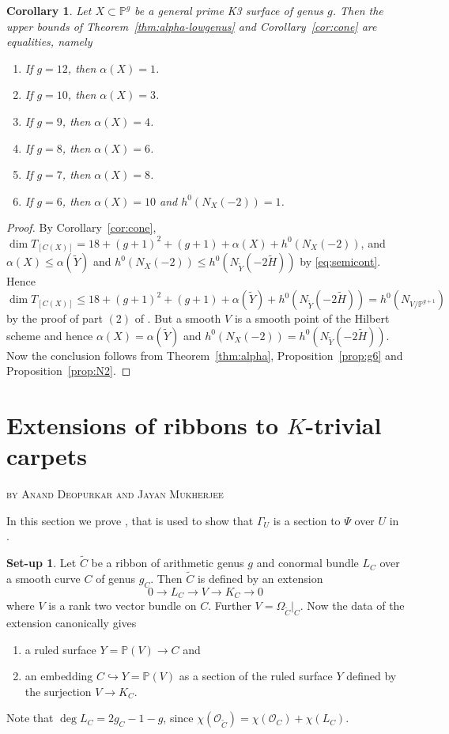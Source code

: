 \documentclass[11pt,twoside]{amsart}
\theoremstyle{plain}
\newtheorem{corollary}[theorem]{Corollary}
\theoremstyle{definition}
\newtheorem{setup}[theorem]{Set-up}
\newcommand{\PP}{\mathbb{P}}
\newcommand{\OO}{\mathcal{O}}
\newcommand{\Yt}{\widetilde{Y}}
\newcommand{\Ht}{\widetilde{H}}
\newcommand{\Ct}{\widetilde{C}}
\newcommand{\NYt}{N_{\Yt}}
\begin{document}
\begin{corollary}\label{cor:equality}
Let $X\subset\PP^g$ be a general prime K3 surface of genus $g$. Then the upper bounds of Theorem~\ref{thm:alpha-lowgenus} and Corollary~\ref{cor:cone} are equalities, namely
\begin{enumerate}
    \item If $g=12$, then $\alpha(X)=1$.
    \item If $g=10$, then $\alpha(X)=3$.
    \item If $g=9$, then $\alpha(X)=4$.
    \item If $g=8$, then $\alpha(X)=6$.
    \item If $g=7$, then $\alpha(X)=8$.
    \item If $g=6$, then $\alpha(X)=10$ and $h^0(N_X(-2))=1$.
\end{enumerate}
\end{corollary}

\begin{proof}
By Corollary~\ref{cor:cone}, $\dim T_{[C(X)]}=18+(g+1)^2+(g+1)+\alpha(X)+h^0(N_X(-2))$, and  $\alpha(X)\le\alpha(\Yt)$ and $h^0(N_X(-2))\le h^0(\NYt(-2\Ht))$ by \eqref{eq:semicont}. Hence $\dim T_{[C(X)]} \leq 18+(g+1)^2+(g+1)+\alpha(\widetilde Y)+h^0(N_{\widetilde Y}(-2\widetilde H)) = h^0(N_{V/\PP^{g+1}})$ by the proof of part $(2)$ of . But a smooth $V$ is a smooth point of the Hilbert scheme and hence $\alpha(X) = \alpha(\Yt)$ and $h^0(N_{X}(-2)) = h^0(N_{\widetilde Y}(-2\widetilde H))$. Now the conclusion follows from Theorem~\ref{thm:alpha}, Proposition~\ref{prop:g6} and Proposition~\ref{prop:N2}.
\end{proof}

\appendix
\section{Extensions of ribbons to \texorpdfstring{$K$}{K}-trivial carpets}\label{sec:extensions}
\begin{center}\textsc{by Anand Deopurkar and Jayan Mukherjee}\end{center}

In this section we prove , that is used to show that $\Gamma_U$ is a section to $\Psi$ over $U$ in . 


\begin{setup}\label{setup:ribbon}
Let $\Ct$ be a ribbon of arithmetic genus $g$ and conormal bundle $L_C$ over a smooth curve $C$ of genus $g_C$. Then $\Ct$ is defined by an extension
\[
0\to L_C\to V\to K_C\to0
\]
where $V$ is a rank two vector bundle on $C$. Further $V=\Omega_{\Ct}|_C$. Now the data of the extension canonically gives
\begin{enumerate}
\item a ruled surface $Y=\PP(V)\to C$ and
\item an embedding $C\hookrightarrow Y=\PP(V)$ as a section of the ruled surface $Y$ defined by the surjection $V\to K_C$.
\end{enumerate}
Note that $\deg L_C=2g_C-1-g$, since $\chi(\OO_{\Ct})=\chi(\OO_C)+\chi(L_C)$. 
\end{setup}
\end{document}
